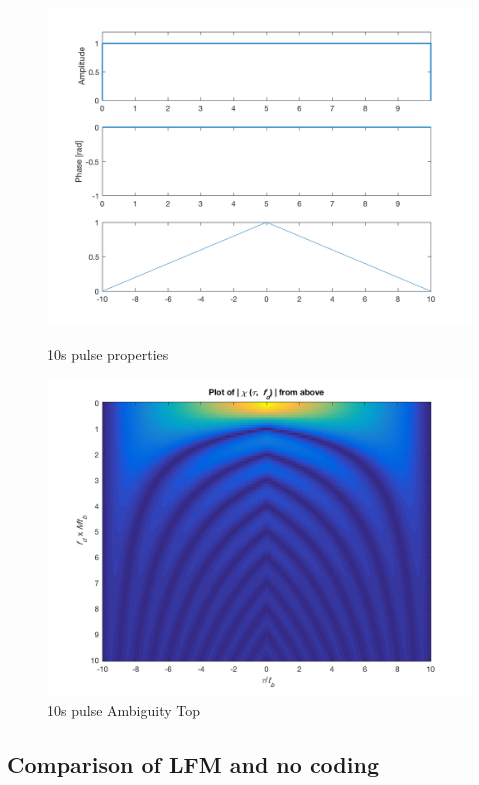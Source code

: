 \begin{figure}
    \begin{minipage}[b]{0.45\textwidth}
    \includegraphics[width=\textwidth]{images/long_props}
    \caption{10s pulse properties}
  \end{minipage}
 \hfill
  \begin{minipage}[b]{0.45\textwidth}
    \includegraphics[width=\textwidth]{images/long_top}
    \caption{10s pulse Ambiguity Top}
    \label{fig:pulse10s_top}
  \end{minipage}
\end{figure}



\subsection{Comparison of LFM and no coding}

